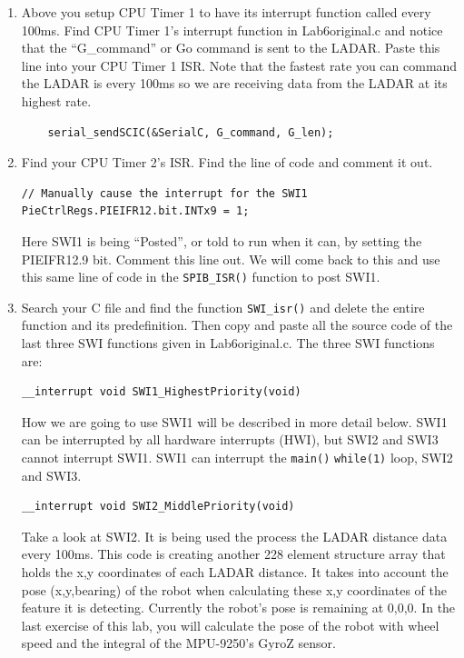\documentclass[11pt]{article}
\begin{document}
\begin{enumerate}
\begin{verbatim}
DELAY_US(1000000); // Delay letting Ladar change its Baud rate
init_serialSCIC(&SerialC,115200);
\end{verbatim}
        \item Above you setup CPU Timer 1 to have its interrupt function called every 100ms. Find CPU Timer 1’s interrupt function in Lab6original.c and notice that the “G\_command” or Go command is sent to the LADAR. Paste this line into your CPU Timer 1 ISR. Note that the fastest rate you can command the LADAR is every 100ms so we are receiving data from the LADAR at its highest rate.
\begin{verbatim}
    serial_sendSCIC(&SerialC, G_command, G_len);
\end{verbatim}
        \item Find your CPU Timer 2’s ISR. Find the line of code and comment it out.
\begin{verbatim}
// Manually cause the interrupt for the SWI1
PieCtrlRegs.PIEIFR12.bit.INTx9 = 1;
\end{verbatim}
            Here SWI1 is being “Posted”, or told to run when it can, by setting the PIEIFR12.9 bit. Comment this line out. We will come back to this and use this same line of code in the \texttt{SPIB_ISR()} function to post SWI1.
            \item Search your C file and find the function \texttt{SWI_isr()} and delete the entire function and its predefinition. Then copy and paste all the source code of the last three SWI functions given in Lab6original.c. The three SWI functions are:
\begin{verbatim}
__interrupt void SWI1_HighestPriority(void)
\end{verbatim}
            How we are going to use SWI1 will be described in more detail below. SWI1 can be interrupted by all hardware interrupts (HWI), but SWI2 and SWI3 cannot interrupt SWI1. SWI1 can interrupt the \texttt{main()} \texttt{while(1)} loop, SWI2 and SWI3.
\begin{verbatim}
__interrupt void SWI2_MiddlePriority(void)
\end{verbatim}
            Take a look at SWI2. It is being used the process the LADAR distance data every 100ms. This code is creating another 228 element structure array that holds the x,y coordinates of each LADAR distance. It takes into account the pose (x,y,bearing) of the robot when calculating these x,y coordinates of the feature it is detecting. Currently the robot’s pose is remaining at 0,0,0. In the last exercise of this lab, you will calculate the pose of the robot with wheel speed and the integral of the MPU-9250’s GyroZ sensor.


\end{enumerate}
\end{document}
